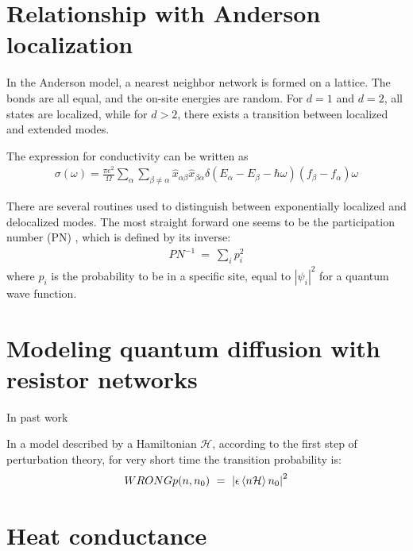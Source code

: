 \section{Relationship with Anderson localization}

In the Anderson model\cite{anderson_absence_1958}, a nearest neighbor network is formed
on a lattice. The bonds are all equal, and the on-site energies are random.
For $d=1$ and $d=2$, all states are localized, while for $d>2$, there exists
a transition between localized and extended modes. 


The expression for conductivity\cite{kubo,greenwood,thouless_electrons_1974} can be written as
%
\begin{align}
\sigma(\omega) = \frac{\pi e^2}{\Omega} \sum_\alpha \sum_{\beta\ne\alpha} 
                 \hat{x}_{\alpha\beta}\hat{x}_{\beta\alpha}\delta(E_\alpha-E_\beta - \hbar\omega)(f_\beta-f_\alpha)\omega
\end{align}
%

There are several routines used to distinguish between exponentially localized and delocalized modes.
The most straight forward one seems to be the participation number (PN) 
\cite{edwards_numerical_1972}, which is defined by its inverse:
%
\begin{align}
PN^{-1} \ =\ \sum_i p_i^2
\end{align}
where $p_i$ is the probability to be in a specific site, equal to $|\psi_i|^2$ 
for a quantum wave function.


\cite{edwards_numerical_1972}

\section{Modeling quantum diffusion with resistor networks}

In past work \cite{cohen_wave_2000} 

In a model described by a Hamiltonian $\mathcal{H}$,
according to the first step of perturbation theory,
for very short time the transition probability is:
%
\begin{align}
WRONG p(n, n_0)\ =\ \left| \epsilon \left\langle{n} \mathcal{H}\right\rangle{n_0}\right|^2
\end{align}
%


\section{Heat conductance}


